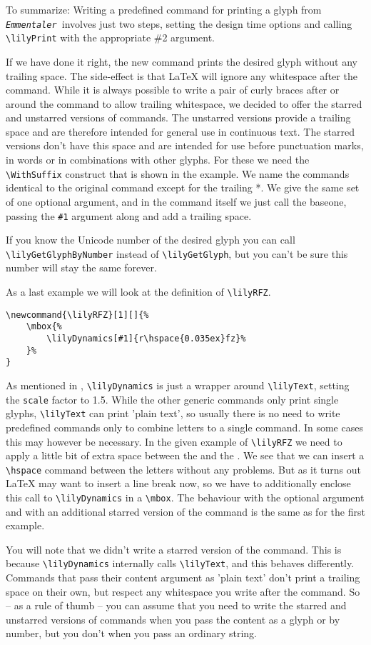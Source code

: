 \documentclass{article}
\newcommand*{\emmentaler}{\texttt{\textit{Emmentaler }}}
\newcommand*{\cmd}[1]{\texttt{\textbackslash #1}}
\begin{document}
To summarize: Writing a predefined command for printing a glyph from \emmentaler involves just two steps, setting the design time options and calling \cmd{lilyPrint} with the appropriate \#2 argument.

\medskip
If we have done it right, the new command prints the desired glyph without any trailing space. 
The side-effect is that \LaTeX{} will ignore any whitespace after the command.
While it is always possible to write a pair of curly braces after or around the command to allow trailing whitespace, we decided to offer the starred and unstarred versions of commands.
The unstarred versions provide a trailing space and are therefore intended for general use in continuous text. 
The starred versions don't have this space and are intended for use before punctuation marks, in words or in combinations with other glyphs.
For these we need the \cmd{WithSuffix} construct that is shown in the example.
We name the commands identical to the original command except for the trailing *.
We give the same set of one optional argument, and in the command itself we just call the baseone, passing the \texttt{\#1} argument along and add a trailing space.

\medskip
If you know the Unicode number of the desired glyph you can call \cmd{lilyGetGlyphByNumber} instead of \cmd{lilyGetGlyph}, but you can't be sure this number will stay the same forever.

\medskip
As a last example we will look at the definition of \lilyRFZ \cmd{lilyRFZ}.

\begin{verbatim}
\newcommand{\lilyRFZ}[1][]{%
	\mbox{%
		\lilyDynamics[#1]{r\hspace{0.035ex}fz}%
	}%
}
\end{verbatim}
As mentioned in , \cmd{lilyDynamics} is just a wrapper around \cmd{lilyText}, setting the \texttt{scale} factor to 1.5.
While the other generic commands only print single glyphs, \cmd{lilyText} can print 'plain text', so usually there is no need to write predefined commands only to combine letters to a single command.
In some cases this may however be necessary.
In the given example of \cmd{lilyRFZ} we need to apply a little bit of extra space between the  and the .
We see that we can insert a \cmd{hspace} command between the letters without any problems.
But as it turns out \LaTeX{} may want to insert a line break now, so we have to additionally enclose this call to \cmd{lilyDynamics} in a \cmd{mbox}.
The behaviour with the optional argument and with an additional starred version of the command is the same as for the first example.

You will note that we didn't write a starred version of the command.
This is because \cmd{lilyDynamics} internally calls \cmd{lilyText}, and this behaves differently. 
Commands that pass their content argument as 'plain text' don't print a trailing space on their own, but respect any whitespace you write after the command.
So -- as a rule of thumb -- you can assume that you need to write the starred and unstarred versions of commands when you pass the content as a glyph or by number, but you don't when you pass an ordinary string.
\end{document}
